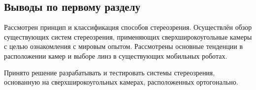 \subsection{Выводы по первому разделу}

Рассмотрен принцип и классификация способов стереозрения. 
Осуществлён обзор существующих систем стереозрения, применяющих 
сверхширокоугольные камеры с целью ознакомления с мировым опытом. 
Рассмотрены основные тенденции в расположении камер и выборе линз 
в существующих мобильных роботах.

Принято решение разрабатывать и тестировать системы стереозрения,
основанную на сверхширокоугольных камерах, расположенных ортогонально.  


